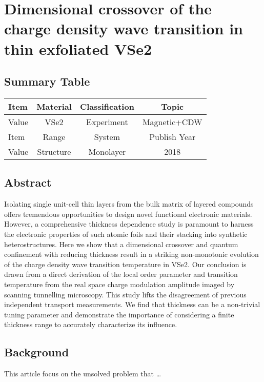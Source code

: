 \setchapterpreamble[u]{\margintoc}
\chapter{Dimensional crossover of the charge density wave transition in thin exfoliated VSe2\cite{P_sztor_2017}}

\section{Summary Table}

\begin{table}[h]
    \begin{tabular}{lccc}
    \hline
    Item  & Material         & Classification & Topic        \\  \hline
    Value & VSe2             & Experiment     & Magnetic+CDW \\  \hline
    Item  & Range            & System         & Publish Year \\  \hline
    Value & Structure        & Monolayer      & 2018         \\  \hline
    \end{tabular}
\end{table}

\section{Abstract}
Isolating single unit-cell thin layers from the bulk matrix of layered compounds offers tremendous opportunities to design novel functional electronic materials. However, a comprehensive thickness dependence study is paramount to harness the electronic properties of such atomic foils and their stacking into synthetic heterostructures. Here we show that a dimensional crossover and quantum confinement with reducing thickness result in a striking non-monotonic evolution of the charge density wave transition temperature in VSe2. Our conclusion is drawn from a direct derivation of the local order parameter and transition temperature from the real space charge modulation amplitude imaged by scanning tunnelling microscopy. This study lifts the disagreement of previous independent transport measurements. We find that thickness can be a non-trivial tuning parameter and demonstrate the importance of considering a finite thickness range to accurately characterize its influence.

\section{Background}
This article focus on the unsolved problem that \dots


